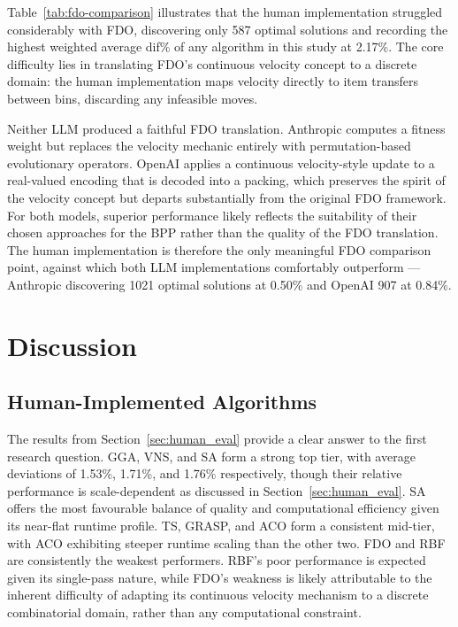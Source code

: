 \documentclass[11pt]{article}
\begin{document}
Table~\ref{tab:fdo-comparison} illustrates that the human implementation struggled considerably with FDO, discovering only 587 optimal solutions and recording the highest weighted average dif\% of any algorithm in this study at 2.17\%. The core difficulty lies in translating FDO's continuous velocity concept to a discrete domain: the human implementation maps velocity directly to item transfers between bins, discarding any infeasible moves.

Neither LLM produced a faithful FDO translation. Anthropic computes a fitness weight but replaces the velocity mechanic entirely with permutation-based evolutionary operators. OpenAI applies a continuous velocity-style update to a real-valued encoding that is decoded into a packing, which preserves the spirit of the velocity concept but departs substantially from the original FDO framework. For both models, superior performance likely reflects the suitability of their chosen approaches for the BPP rather than the quality of the FDO translation. The human implementation is therefore the only meaningful FDO comparison point, against which both LLM implementations comfortably outperform --- Anthropic discovering 1021 optimal solutions at 0.50\% and OpenAI 907 at 0.84\%.

\section{Discussion}

\subsection{Human-Implemented Algorithms}

The results from Section~\ref{sec:human_eval} provide a clear answer to the first research question. GGA, VNS, and SA form a strong top tier, with average deviations of 1.53\%, 1.71\%, and 1.76\% respectively, though their relative performance is scale-dependent as discussed in Section~\ref{sec:human_eval}. SA offers the most favourable balance of quality and computational efficiency given its near-flat runtime profile. TS, GRASP, and ACO form a consistent mid-tier, with ACO exhibiting steeper runtime scaling than the other two. FDO and RBF are consistently the weakest performers. RBF's poor performance is expected given its single-pass nature, while FDO's weakness is likely attributable to the inherent difficulty of adapting its continuous velocity mechanism to a discrete combinatorial domain, rather than any computational constraint.
\end{document}
